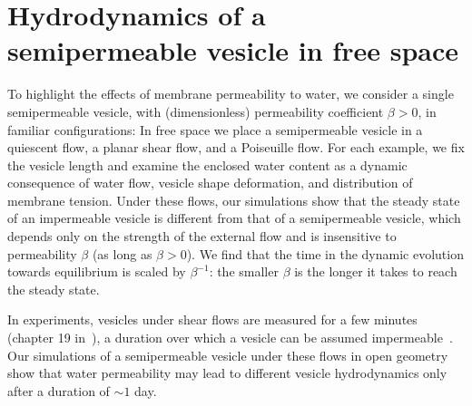 \documentclass[prb,preprint,showpacs,preprintnumbers,amsmath,amssymb,longbibliography]{revtex4-1}
\begin{document}
\section{Hydrodynamics of a semipermeable vesicle in free space\label{sec:free_space}}
To highlight the effects of membrane permeability to water, we consider
a single semipermeable vesicle, with (dimensionless) permeability
coefficient $\beta>0$, in familiar configurations: In free space we
place a semipermeable vesicle in a quiescent flow, a planar shear flow,
and a Poiseuille flow. For each example, we fix the vesicle length and
examine the enclosed water content as a dynamic consequence of water
flow, vesicle shape deformation, and distribution of membrane tension.
%
Under these flows, our simulations show that the steady state of an
impermeable vesicle is different from that of a semipermeable vesicle,
which depends only on the strength of the external flow and is
insensitive to permeability $\beta$ (as long as $\beta>0$). We find that
the time in the dynamic evolution towards equilibrium is scaled by
$\beta^{-1}$: the smaller $\beta$ is the longer it takes to reach the
steady state.

In experiments, vesicles under shear flows are measured for a few
minutes (chapter 19 in~\citet{Dimova2020_GVB}), a duration over which a
vesicle can be assumed impermeable~\cite{AbkarianViallat2005_BJ}. Our
simulations of a semipermeable vesicle under these flows in open
geometry show that water permeability may lead to different vesicle
hydrodynamics only after a duration of $\sim 1$ day. 



\end{document}
